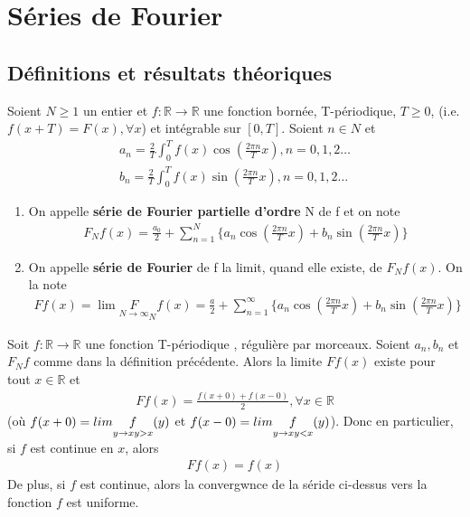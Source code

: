 \chapter[Séries de Fourier]{Séries de Fourier}

\section{Définitions et résultats théoriques}

\begin{myDefinition}
	Soient $N\geq1$ un entier et $f:\mathbb{R}\rightarrow\mathbb{R}$ une fonction bornée, T-périodique, $T\geq0$, (i.e. $f(x+T)=F(x), \forall x$) et intégrable sur $[0,T]$. Soient $n\in N$ et
	\begin{eqnarray}
		a_n=\frac{2}{T}\int_0^Tf(x)\cos(\frac{2\pi n}{T}x), n=0,1,2\dots
		\\
		b_n=\frac{2}{T}\int_0^Tf(x)\sin(\frac{2\pi n}{T}x), n=0,1,2\dots
	\end{eqnarray}
	
	\begin{enumerate}
		\item On appelle \textbf{série de Fourier partielle d'ordre} N de f et on note
		\begin{eqnarray}
			F_Nf(x)=\frac{a_0}{2}+\sum_{n=1}^N\{a_n\cos(\frac{2\pi n}{T}x)+b_n\sin(\frac{2\pi n}{T}x)\}
		\end{eqnarray}
		
		\item On appelle \textbf{série de Fourier} de f la limit, quand elle existe, de $F_Nf(x)$. On la note
		\begin{eqnarray}
			Ff(x)=\lim\underset{N\rightarrow\infty}F_Nf(x)=\frac{a}{2}+\sum_{n=1}^{\infty}\{a_n\cos(\frac{2\pi n}{T}x)+b_n\sin(\frac{2\pi n}{T}x)\}
		\end{eqnarray}
	\end{enumerate}
\end{myDefinition}

\begin{myTheorem}
	Soit $f:\mathbb{R}\rightarrow\mathbb{R}$ une fonction T-périodique , régulière par morceaux. Soient $a_n,b_n$ et $F_Nf$ comme dans la définition précédente. Alors la limite $Ff(x)$ existe pour tout $x\in\mathbb{R}$ et
	\begin{eqnarray}
		Ff(x)=\frac{f(x+0)+f(x-0)}{2},\forall x\in\mathbb{R}
	\end{eqnarray}
	(où $f(x+0)=lim\underset{y\rightarrow x\\y>x}f(y)$ et $f(x-0)=lim\underset{y\rightarrow x\\y<x}f(y)$). Donc en particulier, si $f$ est continue en $x$, alors
	\begin{eqnarray}
		Ff(x)=f(x)
	\end{eqnarray}
	De plus, si $f$ est continue, alors la convergwnce de la séride ci-dessus vers la fonction $f$ est uniforme.
\end{myTheorem}

